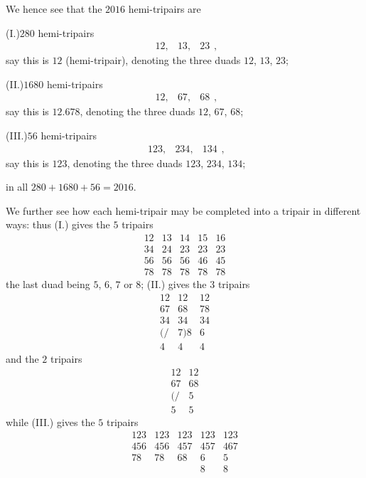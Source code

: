 \documentclass[12pt,a4paper]{article}
\theoremstyle{definition}
\begin{document}
We hence see that the $2016$ hemi-tripairs are

\noindent (I.)\quad $280$ hemi-tripairs
\[
\begin{matrix} 12, & 13, & 23 \end{matrix},
\]
say this is $12$ (hemi-tripair), denoting the three duads $12$, $13$, $23$;

\noindent (II.)\quad $1680$ hemi-tripairs
\[
\begin{matrix} 12, & 67, & 68 \end{matrix},
\]
say this is $12.678$, denoting the three duads $12$, $67$, $68$;

\noindent (III.)\quad $56$ hemi-tripairs
\[
\begin{matrix} 123, & 234, & 134 \end{matrix},
\]
say this is $123$, denoting the three duads $123$, $234$, $134$;

\noindent in all $280 + 1680 + 56 = 2016$.

We further see how each hemi-tripair may be completed into a tripair in different ways: thus (I.) gives the $5$ tripairs
\[
\begin{array}{c|c|c|c|c}
12 & 13 & 14 & 15 & 16 \\
\hline
34 & 24 & 23 & 23 & 23 \\
56 & 56 & 56 & 46 & 45 \\
78 & 78 & 78 & 78 & 78
\end{array}
\]
the last duad being $5$, $6$, $7$ or $8$; (II.) gives the $3$ tripairs
\[
\begin{array}{c|c|c}
12 & 12 & 12 \\
\hline
67 & 68 & 78 \\
34 & 34 & 34 \\
(/ & 7)8 & 6\\
4 & 4 & 4
\end{array}
\]
and the $2$ tripairs
\[
\begin{array}{c|c}
12 & 12 \\
\hline
67 & 68 \\
(/ & 5\\
5 & 5
\end{array}
\]
while (III.) gives the $5$ tripairs
\[
\begin{array}{c|c|c|c|c}
123 & 123 & 123 & 123 & 123 \\
\hline
456 & 456 & 457 & 457 & 467 \\
78 & 78 & 68 & 6 & 5\\
 & & & 8 & 8
\end{array}
\]
\end{document}

